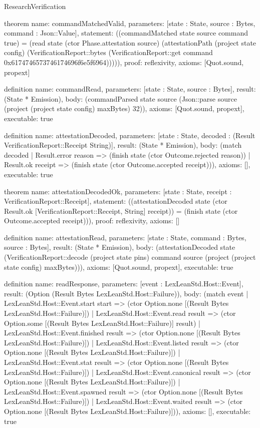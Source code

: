 \begin{lexlean}{ResearchVerification}
\begin{semanticmodule}
theorem{
  name: commandMatchedValid,
  parameters: [state : State, source : Bytes, command : Json::Value],
  statement: ((commandMatched state source command true) = (read state (ctor Phase.attestation source) (attestationPath (project state config) (VerificationReport::bytes (VerificationReport::get command 0x6174746573746174696f6e5f6964))))),
  proof: reflexivity{},
  axioms: [Quot.sound, propext]
}

definition{
  name: commandRead,
  parameters: [state : State, source : Bytes],
  result: (State * Emission),
  body: (commandParsed state source (Json::parse source (project (project state config) maxBytes) 32)),
  axioms: [Quot.sound, propext],
  executable: true
}

definition{
  name: attestationDecoded,
  parameters: [state : State, decoded : (Result VerificationReport::Receipt String)],
  result: (State * Emission),
  body: (match decoded | Result.error reason => (finish state (ctor Outcome.rejected reason)) | Result.ok receipt => (finish state (ctor Outcome.accepted receipt))),
  axioms: [],
  executable: true
}

theorem{
  name: attestationDecodedOk,
  parameters: [state : State, receipt : VerificationReport::Receipt],
  statement: ((attestationDecoded state (ctor Result.ok [VerificationReport::Receipt, String] receipt)) = (finish state (ctor Outcome.accepted receipt))),
  proof: reflexivity{},
  axioms: []
}

definition{
  name: attestationRead,
  parameters: [state : State, command : Bytes, source : Bytes],
  result: (State * Emission),
  body: (attestationDecoded state (VerificationReport::decode (project state pins) command source (project (project state config) maxBytes))),
  axioms: [Quot.sound, propext],
  executable: true
}

definition{
  name: readResponse,
  parameters: [event : LexLeanStd.Host::Event],
  result: (Option (Result Bytes LexLeanStd.Host::Failure)),
  body: (match event | LexLeanStd.Host::Event.start start => (ctor Option.none [(Result Bytes LexLeanStd.Host::Failure)]) | LexLeanStd.Host::Event.read result => (ctor Option.some [(Result Bytes LexLeanStd.Host::Failure)] result) | LexLeanStd.Host::Event.finished result => (ctor Option.none [(Result Bytes LexLeanStd.Host::Failure)]) | LexLeanStd.Host::Event.listed result => (ctor Option.none [(Result Bytes LexLeanStd.Host::Failure)]) | LexLeanStd.Host::Event.stat result => (ctor Option.none [(Result Bytes LexLeanStd.Host::Failure)]) | LexLeanStd.Host::Event.canonical result => (ctor Option.none [(Result Bytes LexLeanStd.Host::Failure)]) | LexLeanStd.Host::Event.spawned result => (ctor Option.none [(Result Bytes LexLeanStd.Host::Failure)]) | LexLeanStd.Host::Event.waited result => (ctor Option.none [(Result Bytes LexLeanStd.Host::Failure)])),
  axioms: [],
  executable: true
}


\end{semanticmodule}
\end{lexlean}
